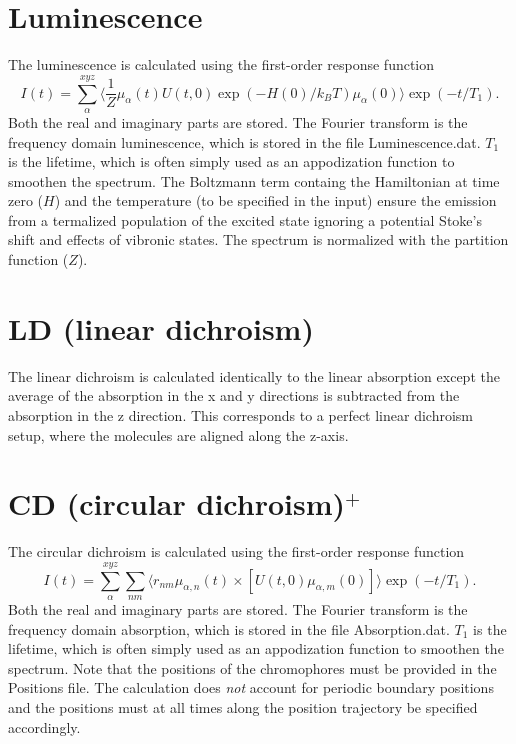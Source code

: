 \section{Luminescence}
The luminescence is calculated using the first-order response function
\begin{equation}
	I(t)=\sum_{\alpha}^{xyz}\langle\frac{1}{Z}\mu_{\alpha}(t)U(t,0)\exp(-H(0)/k_BT)\mu_{\alpha}(0)\rangle\exp(-t/T_1).
\end{equation}
Both the real and imaginary parts are stored. The Fourier transform is the frequency domain luminescence, which is stored in the file Luminescence.dat. $T_1$ is the lifetime, which is often simply used as an appodization function to smoothen the spectrum. The Boltzmann term containg the Hamiltonian at time zero ($H$) and the temperature (to be specified in the input) ensure the emission from a termalized population of the excited state ignoring a potential Stoke's shift and effects of vibronic states. The spectrum is normalized with the partition function ($Z$). 
\section{LD (linear dichroism)}
The linear dichroism is calculated identically to the linear absorption except the average of the absorption in the x and y directions is subtracted from the absorption in the z direction. This corresponds to a perfect linear dichroism setup, where the molecules are aligned along the z-axis.
\section{CD (circular dichroism)$^{+}$}
The circular dichroism is calculated using the first-order response function
\begin{equation}
	I(t)=\sum_{\alpha}^{xyz}\sum_{nm}\langle r_{nm}\mu_{\alpha,n}(t)\times[U(t,0)\mu_{\alpha,m}(0)]\rangle\exp(-t/T_1).
\end{equation}
Both the real and imaginary parts are stored. The Fourier transform is the frequency domain absorption, which is stored in the file Absorption.dat. $T_1$ is the lifetime, which is often simply used as an appodization function to smoothen the spectrum. Note that the positions of the chromophores must be provided in the Positions file. The calculation does \textit{not} account for periodic boundary positions and the positions must at all times along the position trajectory be specified accordingly.
